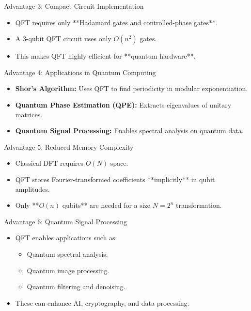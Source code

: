 \documentclass{beamer}
\begin{document}
\begin{frame}{Advantage 3: Compact Circuit Implementation}
    \begin{itemize}
        \item QFT requires only **Hadamard gates and controlled-phase gates**.
        \item A 3-qubit QFT circuit uses only \( O(n^2) \) gates.
        \item This makes QFT highly efficient for **quantum hardware**.
    \end{itemize}
\end{frame}

\begin{frame}{Advantage 4: Applications in Quantum Computing}
    \begin{itemize}
        \item \textbf{Shor’s Algorithm:} Uses QFT to find periodicity in modular exponentiation.
        \item \textbf{Quantum Phase Estimation (QPE):} Extracts eigenvalues of unitary matrices.
        \item \textbf{Quantum Signal Processing:} Enables spectral analysis on quantum data.
    \end{itemize}
\end{frame}

\begin{frame}{Advantage 5: Reduced Memory Complexity}
    \begin{itemize}
        \item Classical DFT requires \( O(N) \) space.
        \item QFT stores Fourier-transformed coefficients **implicitly** in qubit amplitudes.
        \item Only **\( O(n) \) qubits** are needed for a size \( N = 2^n \) transformation.
    \end{itemize}
\end{frame}

\begin{frame}{Advantage 6: Quantum Signal Processing}
    \begin{itemize}
        \item QFT enables applications such as:
        \begin{itemize}
            \item Quantum spectral analysis.
            \item Quantum image processing.
            \item Quantum filtering and denoising.
        \end{itemize}
        \item These can enhance AI, cryptography, and data processing.
    \end{itemize}
\end{frame}
\end{document}
